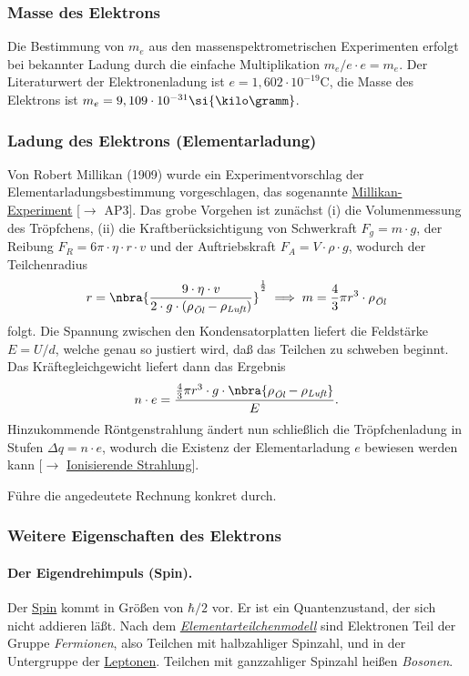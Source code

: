 \documentclass[]{subfiles}
\begin{document}
        \subsubsection*{Masse des Elektrons}
            Die Bestimmung von $m_e$ aus den massenspektrometrischen Experimenten erfolgt bei bekannter Ladung durch die einfache Multiplikation $m_e/e\cdot e=m_e$. Der Literaturwert der Elektronenladung ist $e=1,602\cdot 10^{-19}\si\coulomb$, die Masse des Elektrons ist $m_e=9,109\cdot 10^{-31}\si{\kilo\gramm}$. 

        \subsubsection*{Ladung des Elektrons (Elementarladung)}
            Von Robert Millikan (1909) wurde ein Experimentvorschlag der Elementarladungsbestimmung vorgeschlagen, das sogenannte \href{https://de.wikipedia.org/wiki/Millikan-Experiment}{Millikan-Experiment} [$\to$ AP3]. Das grobe Vorgehen ist zunächst (i) die Volumenmessung des Tröpfchens, (ii) die Kraftberücksichtigung von Schwerkraft $F_g=m\cdot g$, der Reibung $F_R = 6\pi \cdot \eta \cdot r \cdot v$ und der Auftriebskraft $F_A = V\cdot \rho\cdot g$, wodurch der Teilchenradius 
            \[r = \nbra{\frac{9\cdot\eta\cdot v}{2\cdot g\cdot (\rho_\textit{Öl} - \rho_\textit{Luft})}}^{\frac{1}{2}}\implies m=\frac{4}{3}\pi r^3\cdot \rho_\textit{Öl}\]
            folgt. Die Spannung zwischen den Kondensatorplatten liefert die Feldstärke $E=U/d$, welche genau so justiert wird, daß das Teilchen zu schweben beginnt. Das Kräftegleichgewicht liefert dann das Ergebnis
            \[n\cdot e = \frac{\frac{4}{3}\pi r^3\cdot g\cdot \nbra{\rho_\textit{Öl} - \rho_\textit{Luft}}}{E}.\]
            Hinzukommende Röntgenstrahlung ändert nun schließlich die Tröpfchenladung in Stufen $\Delta q=n\cdot e$, wodurch die Existenz der Elementarladung $e$ bewiesen werden kann [$\to$ \href{https://de.wikipedia.org/wiki/Ionisierende_Strahlung}{Ionisierende Strahlung}]. 
            \begin{Aufgabe}
                \nr{} Führe die angedeutete Rechnung konkret durch. 
            \end{Aufgabe}

        \subsubsection*{Weitere Eigenschaften des Elektrons}
            \paragraph*{Der Eigendrehimpuls (Spin).} Der \href{https://de.wikipedia.org/wiki/Spin}{Spin} kommt in Größen von $\hbar/2$ vor. Er ist ein Quantenzustand, der sich nicht addieren läßt. Nach dem \href{https://de.wikipedia.org/wiki/Standardmodell_der_Teilchenphysik}{\emph{Elementarteilchenmodell}} sind Elektronen Teil der Gruppe \emph{Fermionen}, also Teilchen mit halbzahliger Spinzahl, und in der Untergruppe der \href{https://de.wikipedia.org/wiki/Lepton}{Leptonen}. Teilchen mit ganzzahliger Spinzahl heißen \emph{Bosonen}. 
\end{document}
